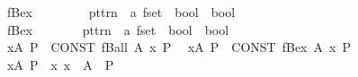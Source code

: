 \begin{isabellebody}
\ \ {\isachardoublequoteopen}{\isacharunderscore}fBex{\isachardoublequoteclose}\ \ \ \ \ \ \ \ {\isacharcolon}{\isacharcolon}\ {\isachardoublequoteopen}pttrn\ {\isasymRightarrow}\ {\isacharprime}a\ fset\ {\isasymRightarrow}\ bool\ {\isasymRightarrow}\ bool{\isachardoublequoteclose}\ \ \ \ \ \ {\isacharparenleft}{\isachardoublequoteopen}{\isacharparenleft}{}{\isasymexists}{\isacharparenleft}{\isacharunderscore}{\isacharslash}{\isacharbar}{\isasymin}{\isacharbar}{\isacharunderscore}{\isacharparenright}{\isachardot}{\isacharslash}\ {\isacharunderscore}{\isacharparenright}{\isachardoublequoteclose}\ {\isacharbrackleft}{}{\isacharcomma}\ {}{\isacharcomma}\ {}{}{\isacharbrackright}\ {}{}{\isacharparenright}\isanewline
\ \ {\isachardoublequoteopen}{\isacharunderscore}fBex{}{\isachardoublequoteclose}\ \ \ \ \ \ \ {\isacharcolon}{\isacharcolon}\ {\isachardoublequoteopen}pttrn\ {\isasymRightarrow}\ {\isacharprime}a\ fset\ {\isasymRightarrow}\ bool\ {\isasymRightarrow}\ bool{\isachardoublequoteclose}\ \ \ \ \ \ {\isacharparenleft}{\isachardoublequoteopen}{\isacharparenleft}{}{\isasymexists}{\isacharbang}{\isacharparenleft}{\isacharunderscore}{\isacharslash}{\isacharbar}{\isasymin}{\isacharbar}{\isacharunderscore}{\isacharparenright}{\isachardot}{\isacharslash}\ {\isacharunderscore}{\isacharparenright}{\isachardoublequoteclose}\ {\isacharbrackleft}{}{\isacharcomma}\ {}{\isacharcomma}\ {}{}{\isacharbrackright}\ {}{}{\isacharparenright}\isanewline
\isanewline
{}\isamarkupfalse%
\isanewline
\ \ {\isachardoublequoteopen}{\isasymforall}x{\isacharbar}{\isasymin}{\isacharbar}A{\isachardot}\ P{\isachardoublequoteclose}\ {\isasymrightleftharpoons}\ {\isachardoublequoteopen}CONST\ fBall\ A\ {\isacharparenleft}{\isasymlambda}x{\isachardot}\ P{\isacharparenright}{\isachardoublequoteclose}\isanewline
\ \ {\isachardoublequoteopen}{\isasymexists}x{\isacharbar}{\isasymin}{\isacharbar}A{\isachardot}\ P{\isachardoublequoteclose}\ {\isasymrightleftharpoons}\ {\isachardoublequoteopen}CONST\ fBex\ A\ {\isacharparenleft}{\isasymlambda}x{\isachardot}\ P{\isacharparenright}{\isachardoublequoteclose}\isanewline
\ \ {\isachardoublequoteopen}{\isasymexists}{\isacharbang}x{\isacharbar}{\isasymin}{\isacharbar}A{\isachardot}\ P{\isachardoublequoteclose}\ {\isasymrightharpoonup}\ {\isachardoublequoteopen}{\isasymexists}{\isacharbang}x{\isachardot}\ x\ {\isacharbar}{\isasymin}{\isacharbar}\ A\ {\isasymand}\ P{\isachardoublequoteclose}\isanewline

\end{isabellebody}
